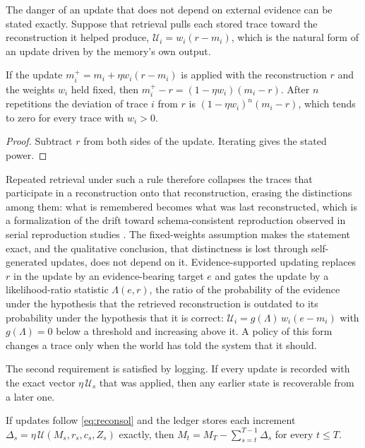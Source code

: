 The danger of an update that does not depend on external evidence can be stated exactly. Suppose that retrieval pulls each stored trace toward the reconstruction it helped produce, $\mathcal U_i=w_i(r-m_i)$, which is the natural form of an update driven by the memory's own output.

\begin{proposition}\label{prop:drift}
If the update $m_i^+=m_i+\eta w_i(r-m_i)$ is applied with the reconstruction $r$ and the weights $w_i$ held fixed, then $m_i^+-r=(1-\eta w_i)(m_i-r)$. After $n$ repetitions the deviation of trace $i$ from $r$ is $(1-\eta w_i)^n(m_i-r)$, which tends to zero for every trace with $w_i>0$.
\end{proposition}

\begin{proof}
Subtract $r$ from both sides of the update. Iterating gives the stated power.
\end{proof}

Repeated retrieval under such a rule therefore collapses the traces that participate in a reconstruction onto that reconstruction, erasing the distinctions among them: what is remembered becomes what was last reconstructed, which is a formalization of the drift toward schema-consistent reproduction observed in serial reproduction studies \cite{bartlett1932}. The fixed-weights assumption makes the statement exact, and the qualitative conclusion, that distinctness is lost through self-generated updates, does not depend on it. Evidence-supported updating replaces $r$ in the update by an evidence-bearing target $e$ and gates the update by a likelihood-ratio statistic $\Lambda(e,r)$, the ratio of the probability of the evidence under the hypothesis that the retrieved reconstruction is outdated to its probability under the hypothesis that it is correct: $\mathcal U_i=g(\Lambda)\,w_i(e-m_i)$ with $g(\Lambda)=0$ below a threshold and increasing above it. A policy of this form changes a trace only when the world has told the system that it should.

The second requirement is satisfied by logging. If every update is recorded with the exact vector $\eta\,\mathcal U_s$ that was applied, then any earlier state is recoverable from a later one.

\begin{proposition}\label{prop:reverse}
If updates follow \eqref{eq:reconsol} and the ledger stores each increment $\Delta_s=\eta\,\mathcal U(M_s,r_s,c_s,Z_s)$ exactly, then $M_t=M_T-\sum_{s=t}^{T-1}\Delta_s$ for every $t\le T$.
\end{proposition}

